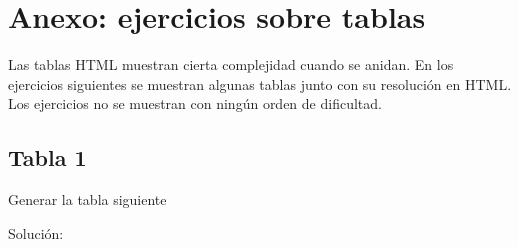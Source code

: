 \documentclass[letterpaper,10pt,spanish]{sphinxmanual}
\begin{document}
\chapter{Anexo: ejercicios sobre tablas}
\label{ejercicios/html/anexo_tablas::doc}\label{ejercicios/html/anexo_tablas:anexo-ejercicios-sobre-tablas}
Las tablas HTML muestran cierta complejidad cuando se anidan. En los ejercicios
siguientes se muestran algunas tablas junto con su resolución en HTML. Los
ejercicios no se muestran con ningún orden de dificultad.


\section{Tabla 1}
\label{ejercicios/html/anexo_tablas:tabla-1}
Generar la tabla siguiente


Solución:
\end{document}
